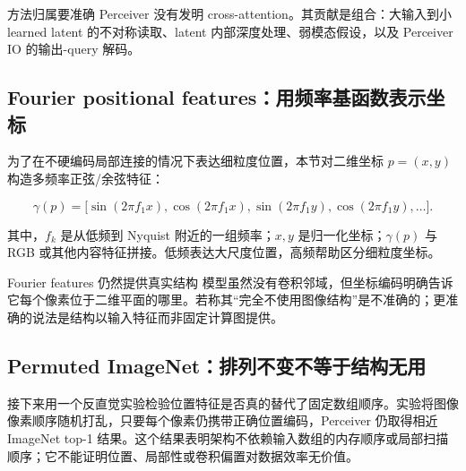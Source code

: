 \begin{importantbox}{方法归属要准确}
Perceiver 没有发明 cross-attention。其贡献是组合：大输入到小 learned latent 的不对称读取、latent 内部深度处理、弱模态假设，以及 Perceiver IO 的输出-query 解码。
\end{importantbox}

\subsection{Fourier positional features：用频率基函数表示坐标}

为了在不硬编码局部连接的情况下表达细粒度位置，本节对二维坐标 $p=(x,y)$ 构造多频率正弦/余弦特征：

\[
\gamma(p)=\big[\sin(2\pi f_1x),\cos(2\pi f_1x),\sin(2\pi f_1y),\cos(2\pi f_1y),\ldots\big].
\]

其中，$f_k$ 是从低频到 Nyquist 附近的一组频率；$x,y$ 是归一化坐标；$\gamma(p)$ 与 RGB 或其他内容特征拼接。低频表达大尺度位置，高频帮助区分细粒度坐标。



\begin{warningbox}{Fourier features 仍然提供真实结构}
模型虽然没有卷积邻域，但坐标编码明确告诉它每个像素位于二维平面的哪里。若称其“完全不使用图像结构”是不准确的；更准确的说法是结构以输入特征而非固定计算图提供。
\end{warningbox}

\subsection{Permuted ImageNet：排列不变不等于结构无用}

接下来用一个反直觉实验检验位置特征是否真的替代了固定数组顺序。实验将图像像素顺序随机打乱，只要每个像素仍携带正确位置编码，Perceiver 仍取得相近 ImageNet top-1 结果。这个结果表明架构不依赖输入数组的内存顺序或局部扫描顺序；它不能证明位置、局部性或卷积偏置对数据效率无价值。


